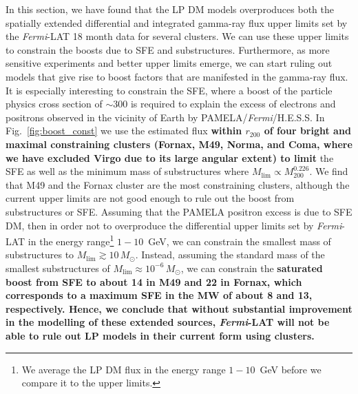 \documentclass[10pt,aps,pra,reprint,amsmath,amsfonts,amssymb,showpacs,nofootinbib,floatfix]{revtex4-1}
\def\del#1{{}}
\def\C#1{{\bf #1}}
\newcommand{\Fermi}{{\em Fermi}\xspace}
\newcommand{\rmn}{\mathrm}
\newcommand{\msun}{M_\odot}
\newcommand{\rvir}{r_{200}}
\newcommand{\mvir}{M_{200}}
\begin{document}
In this section, we have found that the LP DM models overproduces both
the spatially extended differential and integrated gamma-ray flux
upper limits set by the \Fermi-LAT 18 month data for several
clusters. We can use these upper limits to constrain the boosts due to
SFE and substructures. Furthermore, as more sensitive experiments and
better upper limits emerge, we can start ruling out models that give
rise to boost factors that are manifested in the gamma-ray flux. It is
especially interesting to constrain the SFE, where a boost of the
particle physics cross section of $\sim$300 is required to explain the
excess of electrons and positrons observed in the vicinity of Earth by
PAMELA/\Fermi/H.E.S.S. In Fig.~\ref{fig:boost_const} we use the estimated
flux \C{within $\rvir$ of four bright and maximal constraining
  clusters (Fornax, M49, Norma, and Coma, where we have excluded Virgo
  due to its large angular extent) to limit} the SFE as well as the
minimum mass of substructures where
$M_\rmn{lim}\propto\mvir^{0.226}$. We find that M49 and the Fornax
cluster are the most constraining clusters, although the current upper
limits are not good enough to rule out the boost from substructures or
SFE. Assuming that the PAMELA positron excess is due to SFE DM, then
in order not to overproduce the differential upper limits set by
\Fermi-LAT in the energy range\footnote{We average the LP DM flux in
  the energy range $1-10$~GeV before we compare it to the upper
  limits.}  $1-10$~GeV, we can constrain the smallest mass of
substructures to $M_\rmn{lim}\gtrsim 10\,\msun$. Instead, assuming the
standard mass of the smallest substructures of $M_\rmn{lim}\approx
10^{-6}\,\msun$, we can constrain the \C{saturated boost from SFE to
  about 14 in M49 and 22 in Fornax, which corresponds to a maximum SFE
  in the MW of about 8 and 13, respectively. Hence, we conclude that
  without substantial improvement in the modelling of these extended
  sources, \Fermi-LAT will not be able to rule out LP models in their
  current form using clusters.} \del{Note that after about six years
  of observations with \Fermi-LAT, we will be able to rule out the LP
  model assuming a substructure boost with a smallest mass of
  $M_\rmn{lim} \approx 10^{-6}\,\msun$.}
\end{document}
